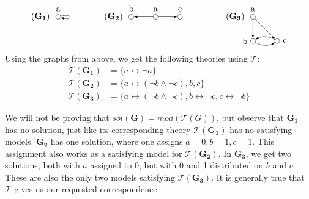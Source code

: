 \begin{example}
  \[
    \begin{tikzpicture}
      [
      point/.style={circle,draw,inner sep=0pt,minimum size=2mm},
      collection/.style={thick,rectangle,draw,inner sep=0pt,minimum height=14mm, minimum width= 9mm}
      ]
      \node (label) at (0,1) [label=left:$(\mathbf{G_1})\;$] {};
      \node (0) at (0,1) [point,label=above:a] {};
      \draw [-latex, loop right] (0) to (0);

      \node (label) at (3,1) [label=left:$(\mathbf{G_2})\;$] {};
      \node (0) at (4,1) [point,label=above:a] {};
      \node (1) at (3,1) [point,label=above:b] {};
      \node (2) at (5,1) [point,label=above:c] {};
      \draw [-latex] (0) to (1);
      \draw [-latex] (0) to (2);

      \node (label) at (8,1) [label=left:$(\mathbf{G_3})\;$] {};
      \node (0) at (8,1) [point,label=above:a] {};
      \node (1) at (8,0) [point,label=left:b] {};
      \node (2) at (9,0) [point,label=right:c] {};
      \draw [-latex] (0) to (2);
      \draw [-latex] (0) to (1);
      \draw [-latex, bend right] (1) to (2);
      \draw [-latex, bend right] (2) to (1);
    \end{tikzpicture}
  \]
  Using the graphs from above, we get the following theories using $\mathcal{T}$:
  \begin{align}
    \mathcal{T}(\mathbf{G_1}) &= \big \{ a \leftrightarrow \neg a \big \} \\
    \mathcal{T}(\mathbf{G_2}) &= \big \{ a \leftrightarrow (\neg b \wedge \neg c), b, c \big \}\\
    \mathcal{T}(\mathbf{G_3}) &= \big \{ a \leftrightarrow (\neg b \wedge \neg c), b \leftrightarrow \neg c, c \leftrightarrow \neg b \big \}
  \end{align}
\end{example}
We will not be proving that $sol(\mathbf{G}) = mod(\mathcal{T}(G))$, but observe that $\mathbf{G_1}$ has no solution, just like its corresponding theory $\mathcal{T}(\mathbf{G_1})$ has no satisfying models.
$\mathbf{G_2}$ has one solution, where one assigns $a=0, b=1, c=1$.
This assignment also works as a satisfying model for $\mathcal{T}(\mathbf{G_2})$.
In $\mathbf{G_3}$, we get two solutions, both with $a$ assigned to 0, but with 0 and 1 distributed on $b$ and $c$.
These are also the only two models satisfying $\mathcal{T}(\mathbf{G_3})$.
It is generally true that $\mathcal{T}$ gives us our requested correspondence\cite{apal-digraph}.

